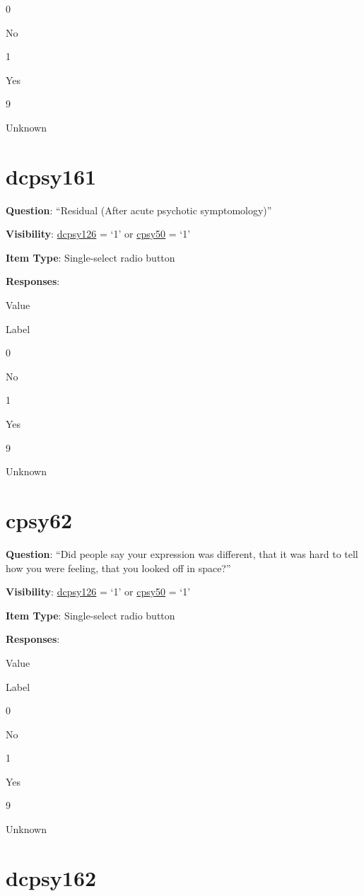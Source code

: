 \documentclass[]{book}
\begin{document}
0

No

1

Yes

9

Unknown

\hypertarget{dcpsy161}{%
\section{dcpsy161}\label{dcpsy161}}

\textbf{Question}: ``Residual (After acute psychotic symptomology)''

\textbf{Visibility}: \protect\hyperlink{dcpsy126}{dcpsy126} = `1' or \protect\hyperlink{cpsy50}{cpsy50} = `1'

\textbf{Item Type}: Single-select radio button

\textbf{Responses}:

Value

Label

0

No

1

Yes

9

Unknown

\hypertarget{cpsy62}{%
\section{cpsy62}\label{cpsy62}}

\textbf{Question}: ``Did people say your expression was different, that it was hard to tell how you were feeling, that you looked off in space?''

\textbf{Visibility}: \protect\hyperlink{dcpsy126}{dcpsy126} = `1' or \protect\hyperlink{cpsy50}{cpsy50} = `1'

\textbf{Item Type}: Single-select radio button

\textbf{Responses}:

Value

Label

0

No

1

Yes

9

Unknown

\hypertarget{dcpsy162}{%
\section{dcpsy162}\label{dcpsy162}}
\end{document}
